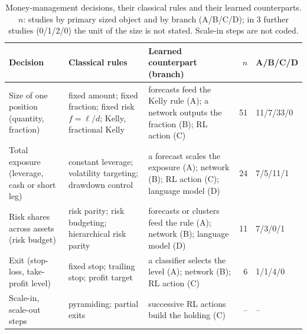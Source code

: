 \begin{table}[t]
\caption{Money-management decisions, their classical rules and their learned counterparts. $n$: studies by primary
sized object and by branch (A/B/C/D); in 3 further studies (0/1/2/0) the unit of the size is not stated. Scale-in steps are not coded.}
\label{tab:mm}
\footnotesize
\setlength{\tabcolsep}{3pt}
\begin{tabular}{@{}>{\raggedright\arraybackslash}p{2.75cm} >{\raggedright\arraybackslash}p{3.75cm} >{\raggedright\arraybackslash}p{4.85cm} r l@{}}
\toprule
Decision & Classical rules & Learned counterpart (branch) & $n$ & A/B/C/D\\
\midrule
Size of one position (quantity, fraction) & fixed amount; fixed fraction; fixed risk $f=\ell/d$; Kelly,
fractional Kelly & forecasts feed the Kelly rule (A); a network outputs the fraction (B); RL action (C) & 51 & 11/7/33/0\\
Total exposure (leverage, cash or short leg) & constant leverage; volatility targeting; drawdown control & a forecast
scales the exposure (A); network (B); RL action (C); language model (D) & 24 & 7/5/11/1\\
Risk shares across assets (risk budget) & risk parity; risk budgeting; hierarchical risk parity & forecasts or
clusters feed the rule (A); network (B); language model (D) & 11 & 7/3/0/1\\
Exit (stop-loss, take-profit level) & fixed stop; trailing stop; profit target & a classifier selects the level
(A); network (B); RL action (C) & 6 & 1/1/4/0\\
Scale-in, scale-out steps & pyramiding; partial exits & successive RL actions build the holding (C) & -- & --\\
\bottomrule
\end{tabular}
\end{table}
